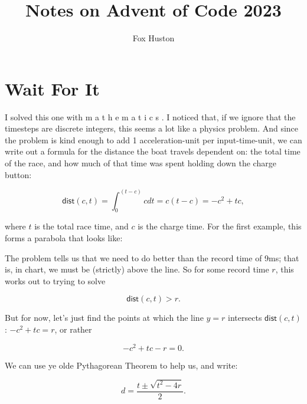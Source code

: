 \documentclass{article}
\title{Notes on Advent of Code 2023}
\author{Fox Huston}
\begin{document}
\maketitle

\setcounter{section}{5}
\section{Wait For It}

I solved this one with  m a t h e m a t i c s . I noticed that, if we ignore that the timesteps are discrete integers, this seems a lot like a physics problem. And since the problem is kind enough to add 1 acceleration-unit per input-time-unit, we can write out a formula for the distance the boat travels dependent on: the total time of the race, and how much of that time was spent holding down the charge button:

$$
  \textsf{dist}(c, t) = \int_0^{(t-c)} c dt = c(t-c) = -c^2 + tc,
$$

where $t$ is the total race time, and $c$ is the charge time. For the first
example, this forms a parabola that looks like:


The problem tells us that we need to do better than the record time of 9ms; that is, in chart, we must be (strictly) above the line. So for some record time $r$, this works out to trying to solve

$$
  \textsf{dist}(c, t) > r.
$$

But for now, let's just find the points at which the line $y = r$ intersects $\textsf{dist}(c, t)$: $-c^2 + tc = r$, or rather

$$
  -c^2 + tc - r = 0.
$$

We can use ye olde Pythagorean Theorem to help us, and write:

$$
  d = \frac{t \pm \sqrt{t^2 - 4r}}{2}.
$$
\end{document}
